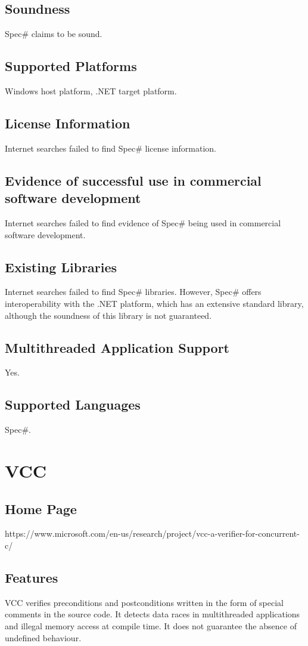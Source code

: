 \documentclass[12pt,openany,a4paper]{book}
\begin{document}
	\subsection{Soundness}
		Spec\# claims to be sound\cite{BarnettMike2005TSPS}.
	\subsection{Supported Platforms}
		Windows host platform, .NET target platform.
	\subsection{License Information}
		Internet searches failed to find Spec\# license information.
	\subsection{Evidence of successful use in commercial software development}
		Internet searches failed to find evidence of Spec\# being used in commercial software development.
	\subsection{Existing Libraries}
		Internet searches failed to find Spec\# libraries. However, Spec\# offers interoperability with the .NET platform, which has an extensive standard library, although the soundness of this library is not guaranteed.
	\subsection{Multithreaded Application Support}
		Yes\cite{spec01}.
	\subsection{Supported Languages}
		Spec\#.









\section{VCC}
	\subsection{Home Page}%
		https://www.microsoft.com/en-us/research/project/vcc-a-verifier-for-concurrent-c/	
	\subsection{Features}
	VCC verifies preconditions and postconditions written in the form of special comments in the source code. 		It detects data races in multithreaded applications and illegal memory access at compile time. It does not 		guarantee the absence of undefined behaviour.
\end{document}
